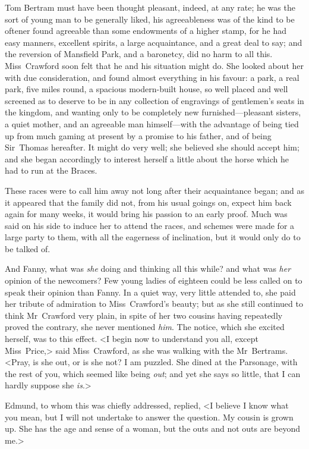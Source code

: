 Tom Bertram must have been thought pleasant, indeed, at any rate; he was the sort of young man to be generally liked, his agreeableness was of the kind to be oftener found agreeable than some endowments of a higher stamp, for he had easy manners, excellent spirits, a large acquaintance, and a great deal to say; and the reversion of Mansfield Park, and a baronetcy, did no harm to all this. Miss~Crawford soon felt that he and his situation might do. She looked about her with due consideration, and found almost everything in his favour: a park, a real park, five miles round, a spacious modern-built house, so well placed and well screened as to deserve to be in any collection of engravings of gentlemen's seats in the kingdom, and wanting only to be completely new furnished—pleasant sisters, a quiet mother, and an agreeable man himself—with the advantage of being tied up from much gaming at present by a promise to his father, and of being Sir~Thomas hereafter. It might do very well; she believed she should accept him; and she began accordingly to interest herself a little about the horse which he had to run at the B\doubleemdash races.

These races were to call him away not long after their acquaintance began; and as it appeared that the family did not, from his usual goings on, expect him back again for many weeks, it would bring his passion to an early proof. Much was said on his side to induce her to attend the races, and schemes were made for a large party to them, with all the eagerness of inclination, but it would only do to be talked of.

And Fanny, what was \textit{she}  doing and thinking all this while? and what was \textit{her}  opinion of the newcomers? Few young ladies of eighteen could be less called on to speak their opinion than Fanny. In a quiet way, very little attended to, she paid her tribute of admiration to Miss~Crawford's beauty; but as she still continued to think Mr~Crawford very plain, in spite of her two cousins having repeatedly proved the contrary, she never mentioned \textit{him}. The notice, which she excited herself, was to this effect. <I begin now to understand you all, except Miss~Price,> said Miss~Crawford, as she was walking with the Mr~Bertrams. <Pray, is she out, or is she not? I am puzzled. She dined at the Parsonage, with the rest of you, which seemed like being \textit{out}; and yet she says so little, that I can hardly suppose she \textit{is}.>

Edmund, to whom this was chiefly addressed, replied, <I believe I know what you mean, but I will not undertake to answer the question. My cousin is grown up. She has the age and sense of a woman, but the outs and not outs are beyond me.>

